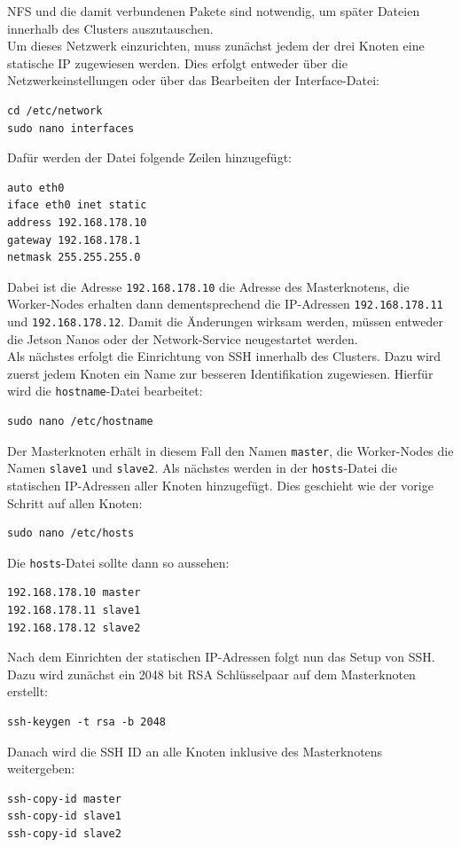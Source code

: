 \documentclass[doktyp=semarbeit, sprache=german]{TUBAFarbeiten}
\begin{document}
NFS und die damit verbundenen Pakete sind notwendig, um später Dateien innerhalb des Clusters auszutauschen.
\\Um dieses Netzwerk einzurichten, muss zunächst jedem der drei Knoten eine statische IP zugewiesen werden. Dies erfolgt entweder über die Netzwerkeinstellungen oder über das Bearbeiten der Interface-Datei:
\begin{lstlisting}
cd /etc/network
sudo nano interfaces
\end{lstlisting}
Dafür werden der Datei folgende Zeilen hinzugefügt:
\begin{lstlisting}
auto eth0
iface eth0 inet static
address 192.168.178.10
gateway 192.168.178.1
netmask 255.255.255.0
\end{lstlisting}
Dabei ist die Adresse \texttt{192.168.178.10} die Adresse des Masterknotens, die Worker-Nodes erhalten dann dementsprechend die IP-Adressen \texttt{192.168.178.11} und \texttt{192.168.178.12}. Damit die Änderungen wirksam werden, müssen entweder die Jetson Nanos oder der Network-Service neugestartet werden.
\\Als nächstes erfolgt die Einrichtung von SSH innerhalb des Clusters. Dazu wird zuerst jedem Knoten ein Name zur besseren Identifikation zugewiesen. Hierfür wird die \texttt{hostname}-Datei bearbeitet:
\begin{lstlisting}
sudo nano /etc/hostname
\end{lstlisting}
Der Masterknoten erhält in diesem Fall den Namen \texttt{master}, die Worker-Nodes die Namen \texttt{slave1} und \texttt{slave2}. Als nächstes werden in der \texttt{hosts}-Datei die statischen IP-Adressen aller Knoten hinzugefügt. Dies geschieht wie der vorige Schritt auf allen Knoten:
\begin{lstlisting}
sudo nano /etc/hosts
\end{lstlisting}
Die \texttt{hosts}-Datei sollte dann so aussehen:
\begin{lstlisting}
192.168.178.10 master
192.168.178.11 slave1
192.168.178.12 slave2
\end{lstlisting}
Nach dem Einrichten der statischen IP-Adressen folgt nun das Setup von SSH. Dazu wird zunächst ein 2048 bit RSA Schlüsselpaar auf dem Masterknoten erstellt:
\begin{lstlisting}
ssh-keygen -t rsa -b 2048
\end{lstlisting}
Danach wird die SSH ID an alle Knoten inklusive des Masterknotens weitergeben:
\begin{lstlisting}
ssh-copy-id master
ssh-copy-id slave1
ssh-copy-id slave2
\end{lstlisting}
\end{document}
